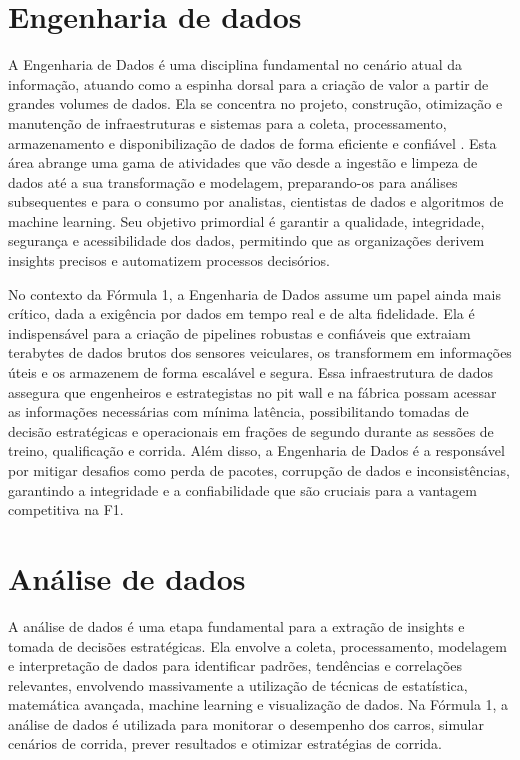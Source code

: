 \documentclass[12pt, %
openright, 
oneside, %
a4paper,    %
brazil]{facom-ufu-abntex2}
\begin{document}
\section{Engenharia de dados}
A Engenharia de Dados é uma disciplina fundamental no cenário atual da informação, atuando como a 
espinha dorsal para a criação de valor a partir de grandes volumes de dados. 
Ela se concentra no projeto, construção, otimização e manutenção de infraestruturas e sistemas 
para a coleta, processamento, armazenamento e disponibilização de dados de forma eficiente e 
confiável \cite{Reis2022DataEngineering}. Esta área abrange uma gama de atividades que vão desde a 
ingestão e limpeza de dados até a sua transformação e modelagem, preparando-os para análises 
subsequentes e para o consumo por analistas, cientistas de dados e algoritmos de machine learning. 
Seu objetivo primordial é garantir a qualidade, integridade, segurança e acessibilidade dos dados, 
permitindo que as organizações derivem insights precisos e automatizem processos decisórios.

No contexto da Fórmula 1, a Engenharia de Dados assume um papel ainda mais crítico, dada a 
exigência por dados em tempo real e de alta fidelidade. Ela é indispensável para a criação de 
pipelines robustas e confiáveis que extraiam terabytes de dados brutos dos sensores veiculares, os 
transformem em informações úteis e os armazenem de forma escalável e segura. Essa infraestrutura 
de dados assegura que engenheiros e estrategistas no pit wall e na fábrica possam acessar as 
informações necessárias com mínima latência, possibilitando tomadas de decisão estratégicas e 
operacionais em frações de segundo durante as sessões de treino, qualificação e corrida. Além 
disso, a Engenharia de Dados é a responsável por mitigar desafios como perda de pacotes, corrupção 
de dados e inconsistências, garantindo a integridade e a confiabilidade que são cruciais para a 
vantagem competitiva na F1.

\section{Análise de dados}

A análise de dados é uma etapa fundamental para a extração de insights e tomada de decisões estratégicas. Ela envolve a coleta, processamento, modelagem e interpretação de dados para identificar padrões, tendências e correlações relevantes,
envolvendo massivamente a utilização de técnicas de estatística, matemática avançada, machine learning e visualização de dados.
Na Fórmula 1, a análise de dados é utilizada para monitorar o desempenho dos carros, simular cenários de corrida, prever resultados e otimizar estratégias de corrida.
\end{document}
